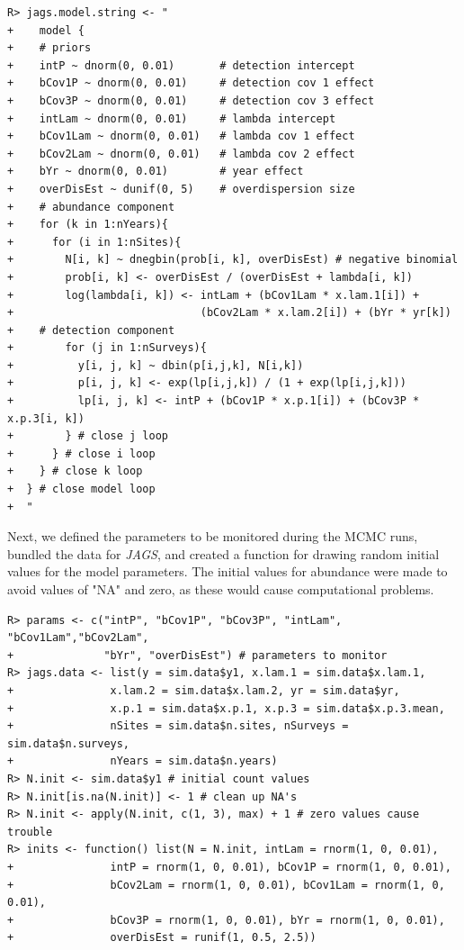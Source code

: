 \documentclass{article}
\begin{document}
\begin{verbatim}
R> jags.model.string <- "
+    model {
+    # priors
+    intP ~ dnorm(0, 0.01)       # detection intercept
+    bCov1P ~ dnorm(0, 0.01)     # detection cov 1 effect
+    bCov3P ~ dnorm(0, 0.01)     # detection cov 3 effect
+    intLam ~ dnorm(0, 0.01)     # lambda intercept
+    bCov1Lam ~ dnorm(0, 0.01)   # lambda cov 1 effect
+    bCov2Lam ~ dnorm(0, 0.01)   # lambda cov 2 effect
+    bYr ~ dnorm(0, 0.01)        # year effect
+    overDisEst ~ dunif(0, 5)    # overdispersion size
+    # abundance component
+    for (k in 1:nYears){
+      for (i in 1:nSites){
+        N[i, k] ~ dnegbin(prob[i, k], overDisEst) # negative binomial
+        prob[i, k] <- overDisEst / (overDisEst + lambda[i, k])
+        log(lambda[i, k]) <- intLam + (bCov1Lam * x.lam.1[i]) + 
+                             (bCov2Lam * x.lam.2[i]) + (bYr * yr[k])
+    # detection component
+        for (j in 1:nSurveys){
+          y[i, j, k] ~ dbin(p[i,j,k], N[i,k])
+          p[i, j, k] <- exp(lp[i,j,k]) / (1 + exp(lp[i,j,k]))
+          lp[i, j, k] <- intP + (bCov1P * x.p.1[i]) + (bCov3P * x.p.3[i, k])
+        } # close j loop
+      } # close i loop
+    } # close k loop
+  } # close model loop
+  "
\end{verbatim}

Next, we defined the parameters to be monitored during the MCMC runs, bundled the data for \emph{JAGS}, and created a function for drawing random initial values for the model parameters. The initial values for abundance were made to avoid values of "NA" and zero, as these would cause computational problems.

\begin{verbatim}
R> params <- c("intP", "bCov1P", "bCov3P", "intLam", "bCov1Lam","bCov2Lam",
+              "bYr", "overDisEst") # parameters to monitor
R> jags.data <- list(y = sim.data$y1, x.lam.1 = sim.data$x.lam.1,
+               x.lam.2 = sim.data$x.lam.2, yr = sim.data$yr,
+               x.p.1 = sim.data$x.p.1, x.p.3 = sim.data$x.p.3.mean,
+               nSites = sim.data$n.sites, nSurveys = sim.data$n.surveys,
+               nYears = sim.data$n.years)
R> N.init <- sim.data$y1 # initial count values
R> N.init[is.na(N.init)] <- 1 # clean up NA's
R> N.init <- apply(N.init, c(1, 3), max) + 1 # zero values cause trouble
R> inits <- function() list(N = N.init, intLam = rnorm(1, 0, 0.01),
+               intP = rnorm(1, 0, 0.01), bCov1P = rnorm(1, 0, 0.01),
+               bCov2Lam = rnorm(1, 0, 0.01), bCov1Lam = rnorm(1, 0, 0.01),
+               bCov3P = rnorm(1, 0, 0.01), bYr = rnorm(1, 0, 0.01),
+               overDisEst = runif(1, 0.5, 2.5))
\end{verbatim}
\end{document}
